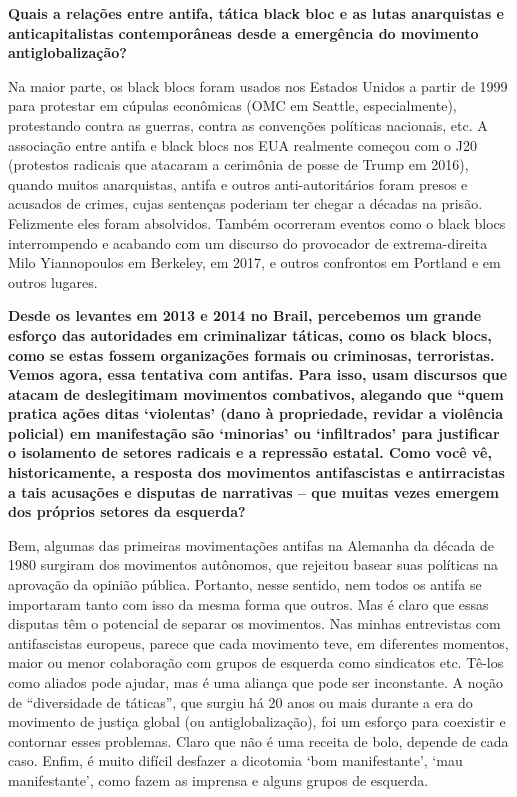 \textbf{Quais a relações entre antifa, tática black bloc e as lutas anarquistas e anticapitalistas contemporâneas desde a emergência do movimento antiglobalização?}
 
Na maior parte, os black blocs foram usados nos Estados Unidos a partir de 1999 para protestar em cúpulas econômicas (OMC em Seattle, especialmente), protestando contra as guerras, contra as convenções políticas nacionais, etc. A associação entre antifa e black blocs nos EUA realmente começou com o J20 (protestos radicais que atacaram a cerimônia de posse de Trump em 2016), quando muitos anarquistas, antifa e outros anti-autoritários foram presos e acusados de crimes, cujas sentenças poderiam ter chegar a décadas na prisão. Felizmente eles foram absolvidos. Também ocorreram eventos como o black blocs interrompendo e acabando com um discurso do provocador de extrema-direita Milo Yiannopoulos em Berkeley, em 2017, e outros confrontos em Portland e em outros lugares. 

\textbf{Desde os levantes em 2013 e 2014 no Brail, percebemos um grande esforço das autoridades em criminalizar táticas, como os black blocs, como se estas fossem organizações formais ou criminosas, terroristas. Vemos agora, essa tentativa com antifas. Para isso, usam discursos que atacam de deslegitimam movimentos combativos, alegando que “quem pratica ações ditas ‘violentas’ (dano à propriedade, revidar a violência policial) em manifestação são ‘minorias’ ou ‘infiltrados’ para justificar o isolamento de setores radicais e a repressão estatal. Como você vê, historicamente, a resposta dos movimentos antifascistas e antirracistas a tais acusações e disputas de narrativas – que muitas vezes emergem dos próprios setores da esquerda?}
 
Bem, algumas das primeiras movimentações antifas na Alemanha da década de 1980 surgiram dos movimentos autônomos, que rejeitou basear suas políticas na aprovação da opinião pública. Portanto, nesse sentido, nem todos os antifa se importaram tanto com isso da mesma forma que outros. Mas é claro que essas disputas têm o potencial de separar os movimentos. Nas minhas entrevistas com antifascistas europeus, parece que cada movimento teve, em diferentes momentos, maior ou menor colaboração com grupos de esquerda como sindicatos etc. Tê-los como aliados pode ajudar, mas é uma aliança que  pode ser inconstante. A noção de “diversidade de táticas”, que surgiu há 20 anos ou mais durante a era do movimento  de justiça global (ou antiglobalização), foi um esforço para coexistir e contornar esses problemas. Claro que não é uma receita de bolo, depende de cada caso. Enfim, é muito difícil desfazer a dicotomia ‘bom manifestante’, ‘mau manifestante’, como fazem as imprensa e alguns grupos de esquerda. 
 
